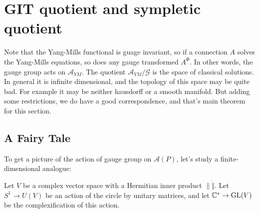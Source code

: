 \documentclass[11pt]{amsart}
\numberwithin{equation}{section}
\theoremstyle{plain}
\theoremstyle{plain}
\numberwithin{equation}{section}
\begin{document}
\section{GIT quotient and sympletic quotient}
Note that the Yang-Mills functional is guage invariant, so if a connection $A$ solves the Yang-Mills equations, so does any gauge transformed $A^{\Phi}$. In other words, the gauge group acts on $\mathscr{A}_{YM}$. The quotient $\mathscr{A}_{YM}/\mathscr{G}$ is the space of classical solutions. In general it is infinite dimensional, and the topology of this space may be quite bad. For example it may be neither hausdorff or a smooth manifold. But adding some restrictions, we do have a good correspondence, and that's main theorem for this section.

\subsection{A Fairy Tale}
To get a picture of the action of gauge group on $\mathscr{A}(P)$, let's study a finite-dimensional analogue:

Let $V$ be a complex vector space with a Hermitian inner product $\|\dot\|$. Let $S^1\to U(V)$ be an action of the circle by unitary matrices, and let $\Bbb{C}^*\to\operatorname{GL}(V)$ be the complexification of this action.
\end{document}

